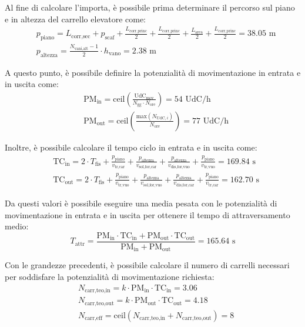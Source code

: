 \documentclass[11pt]{article}
\begin{document}
\noindent
Al fine di calcolare l'importa, è possibile prima determinare il percorso sul piano e in altezza del carrello elevatore come:
\begin{align}
    & p_\text{piano} = L_\text{corr,sec} + p_\text{scaf} + \frac{L_\text{corr,princ}}{2} + \frac{L_\text{corr,princ}}{2} + \frac{L_\text{area}}{2} + \frac{L_\text{corr,princ}}{2} = 38.05 \text{ m} \\
    & p_\text{altezza} = \frac{N_\text{vani,alt} - 1}{2} \cdot h_\text{vano} = 2.38 \text{ m}
\end{align}

\noindent
A questo punto, è possibile definire la potenzialità di movimentazione in entrata e in uscita come:
\begin{align}
    & \text{PM}_\text{in} = \text{ceil}\left(\frac{\text{UdC}_\text{mov}}{N_\text{gg} \cdot N_\text{ore}}\right) = 54 \text{ UdC/h} \\
    & \text{PM}_\text{out} = \text{ceil}\left(\frac{\text{max}(N_{\text{UdC},i})}{N_\text{ore}}\right) = 77 \text{ UdC/h}
\end{align}

\newpage
\noindent
Inoltre, è possibile calcolare il tempo ciclo in entrata e in uscita come:
\begin{align}
    & \text{TC}_\text{in} = 2 \cdot T_\text{fis} + \frac{p_\text{piano}}{v_\text{tr,car}} + \frac{p_\text{altezza}}{v_\text{sol,for,car}} + \frac{p_\text{altezza}}{v_\text{dis,for,vuo}} + \frac{p_\text{piano}}{v_\text{tr,vuo}} = 169.84 \text{ s} \\
    & \text{TC}_\text{out} = 2 \cdot T_\text{fis} + \frac{p_\text{piano}}{v_\text{tr,vuo}} + \frac{p_\text{altezza}}{v_\text{sol,for,vuo}} + \frac{p_\text{altezza}}{v_\text{dis,for,car}} + \frac{p_\text{piano}}{v_\text{tr,car}} = 162.70 \text{ s}
\end{align}

\noindent
Da questi valori è possibile eseguire una media pesata con le potenzialità di movimentazione in entrata e in uscita per ottenere il tempo di attraversamento medio:
\begin{equation}
    T_\text{attr} = \frac{\text{PM}_\text{in} \cdot \text{TC}_\text{in} + \text{PM}_\text{out} \cdot \text{TC}_\text{out}}{\text{PM}_\text{in} + \text{PM}_\text{out}} = 165.64 \text{ s}
\end{equation}

\noindent
Con le grandezze precedenti, è possibile calcolare il numero di carrelli necessari per soddisfare la potenzialità di movimentazione richiesta:
\begin{align}
    & N_\text{carr,teo,in} = k \cdot \text{PM}_\text{in} \cdot \text{TC}_\text{in} = 3.06 \\
    & N_\text{carr,teo,out} = k \cdot \text{PM}_\text{out} \cdot \text{TC}_\text{out} = 4.18 \\
    & N_\text{carr,eff} = \text{ceil}\left(N_\text{carr,teo,in} + N_\text{carr,teo,out}\right) = 8
\end{align}
\end{document}
